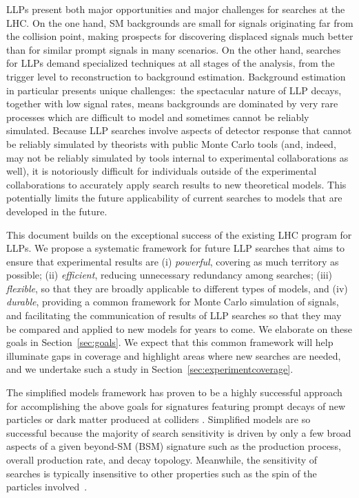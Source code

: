 LLPs present both major opportunities and major challenges for searches at the LHC.  On the one hand,  SM backgrounds are small for signals originating far from the collision point, making prospects for discovering displaced signals much better than for  similar prompt signals in many scenarios.  On the other hand, searches for LLPs demand specialized techniques at all stages of the analysis, from the trigger level to reconstruction to background estimation. Background estimation in particular presents unique challenges:~the spectacular nature of LLP decays, together with low signal rates, means backgrounds are dominated by very rare processes which are difficult to model and sometimes cannot be reliably simulated.  Because LLP searches involve aspects of detector response that cannot be reliably simulated by theorists with public Monte Carlo tools (and, indeed, may not be reliably simulated by tools internal to experimental collaborations as well), it is notoriously difficult for individuals outside of the experimental collaborations to accurately apply search results to new theoretical models. This  potentially limits the future applicability of current searches to models that are developed in the future.  

This document builds on the exceptional success of the existing LHC program for LLPs. We propose a systematic framework for future LLP searches that aims to ensure that experimental results are (i) {\em powerful}, covering as much territory as possible; (ii) {\em efficient}, reducing unnecessary redundancy among searches; (iii) {\em flexible}, so that they are broadly applicable to different types of models, and (iv) {\em durable}, providing a common framework for Monte Carlo simulation of signals, and facilitating the communication of results of LLP searches so that they may be compared and applied to new models for years to come. We elaborate on these goals in Section~\ref{sec:goals}.
We expect that this common framework will help illuminate gaps in coverage and highlight areas where new searches are needed, and we undertake such a study in Section~\ref{sec:experimentcoverage}.


The simplified models framework has proven to be a highly successful approach for accomplishing the above goals for signatures featuring prompt decays of new particles \cite{Alves:2011wf} or dark matter produced at colliders \cite{Abdallah:2015ter}.  Simplified models are so successful because the majority of search sensitivity is driven by only a few broad aspects of a given beyond-SM (BSM) signature such as the production process, overall production rate, and decay topology. Meanwhile, the sensitivity of searches is typically insensitive to other properties such as the spin of the particles involved~\cite{Edelhauser:2015ksa,Edelhauser:2014ena,Arina:2015uea,Kraml:2016eti}.

